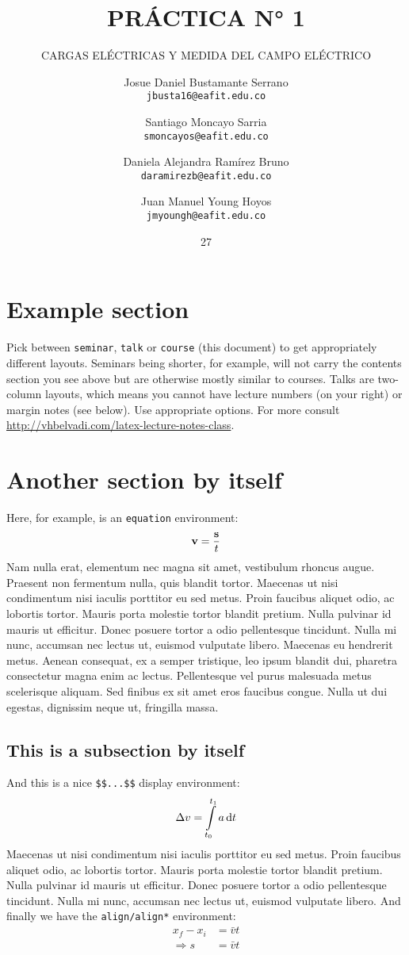 \documentclass[spanish,course]{lecture}
\title{PRÁCTICA N° 1}
\subtitle{
CARGAS ELÉCTRICAS Y MEDIDA DEL CAMPO ELÉCTRICO
}
\author{
  Josue Daniel Bustamante Serrano\\
  \texttt{jbusta16@eafit.edu.co}\\
  \and
  Santiago Moncayo Sarria\\
  \texttt{smoncayos@eafit.edu.co}\\
  \and
  Daniela Alejandra Ramírez Bruno\\
  \texttt{daramirezb@eafit.edu.co}\\
  \and
  Juan Manuel Young Hoyos\\
  \texttt{jmyoungh@eafit.edu.co}
}
\date{27}{07}{2022}
\begin{document}
\tableofcontents



\section{Example section}
Pick between \texttt{seminar}, \texttt{talk} or \texttt{course} (this document) to get appropriately different layouts. Seminars being shorter, for example, will not carry the contents section you see above but are otherwise mostly similar to courses. Talks are two-column layouts, which means you cannot have lecture numbers (on your right) or margin notes (see below). Use appropriate options. For more consult \url{http://vhbelvadi.com/latex-lecture-notes-class}.

\lipsum[1-2]
%
\section{Another section by itself}
\lipsum[3] Here, for example, is an \texttt{equation} environment:
\begin{equation}
\mathbf{v} = { \mathbf{s} \over t } \label{eq:velocity}
\end{equation}%
Nam nulla erat, elementum nec magna sit amet, vestibulum rhoncus augue. Praesent non fermentum nulla, quis blandit tortor. Maecenas ut nisi condimentum nisi iaculis porttitor eu sed metus. Proin faucibus aliquet odio, ac lobortis tortor. Mauris porta molestie tortor blandit pretium. Nulla pulvinar id mauris ut efficitur. Donec posuere tortor a odio pellentesque tincidunt. Nulla mi nunc, accumsan nec lectus ut, euismod vulputate libero.
%
Maecenas eu hendrerit metus. Aenean consequat, ex a semper tristique, leo ipsum blandit dui, pharetra consectetur magna enim ac lectus. Pellentesque vel purus malesuada metus scelerisque aliquam. Sed finibus ex sit amet eros faucibus congue. Nulla ut dui egestas, dignissim neque ut, fringilla massa.
%
\subsection{This is a subsection by itself}
\lipsum[11]
%
And this is a nice \texttt{\$\$...\$\$} display environment:
$$
\Delta v = \int\displaylimits_{t_0}^{t_1} a \, \textrm{d}t
$$
Maecenas ut nisi condimentum nisi iaculis porttitor eu sed metus. Proin faucibus aliquet odio, ac lobortis tortor. Mauris porta molestie tortor blandit pretium. Nulla pulvinar id mauris ut efficitur. Donec posuere tortor a odio pellentesque tincidunt. Nulla mi nunc, accumsan nec lectus ut, euismod vulputate libero.
%
And finally we have the \texttt{align/align*} environment:
\begin{align}
x_f - x_i &= \bar{v}t \nonumber\\
\Rightarrow s &= \bar{v}t
\end{align}
\lipsum[6]
%
\end{document}
